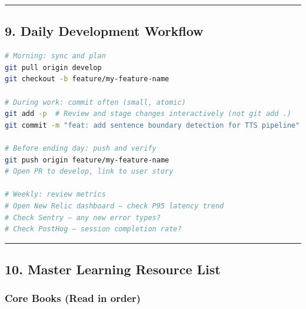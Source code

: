 \documentclass[
  11pt,
]{article}
\begin{document}
\begin{center}\rule{0.5\linewidth}{0.5pt}\end{center}

\hypertarget{daily-development-workflow}{%
\subsection{9. Daily Development
Workflow}\label{daily-development-workflow}}

\begin{lstlisting}[language=bash]
# Morning: sync and plan
git pull origin develop
git checkout -b feature/my-feature-name

# During work: commit often (small, atomic)
git add -p  # Review and stage changes interactively (not git add .)
git commit -m "feat: add sentence boundary detection for TTS pipeline"

# Before ending day: push and verify
git push origin feature/my-feature-name
# Open PR to develop, link to user story

# Weekly: review metrics
# Open New Relic dashboard — check P95 latency trend
# Check Sentry — any new error types?
# Check PostHog — session completion rate?
\end{lstlisting}

\begin{center}\rule{0.5\linewidth}{0.5pt}\end{center}

\hypertarget{master-learning-resource-list}{%
\subsection{10. Master Learning Resource
List}\label{master-learning-resource-list}}

\hypertarget{core-books-read-in-order}{%
\subsubsection{Core Books (Read in
order)}\label{core-books-read-in-order}}
\end{document}
